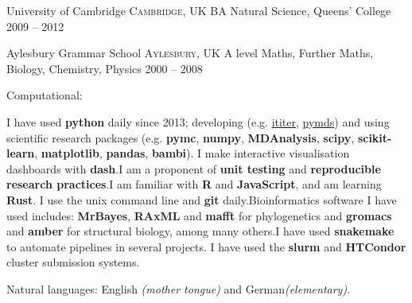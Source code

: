 \documentclass[10pt,a4paper]{article}
\begin{document}
\headedsection
{University of Cambridge}
{\textsc{Cambridge, UK}} {%
  \headedsubsection
  {BA Natural Science, Queens' College}
  {2009 -- 2012}
  {
  }
}

\headedsection
{Aylesbury Grammar School}
{\textsc{Aylesbury, UK}} {
  \headedsubsection
  {A level Maths, Further Maths, Biology, Chemistry, Physics}
  {2000 -- 2008}
  {}
}

\spacedhrule{0.9em}{-0.4em}


\inlineheadsection  %
{Computational:} {
  
  I have used \textbf{python} daily since 2013; developing (e.g.\@
  \href{https://ititer.readthedocs.io/}{ititer},
  \href{https://pymds.readthedocs.io}{pymds}) and using scientific research packages
  (e.g. \textbf{pymc}, \textbf{numpy}, \textbf{MDAnalysis}, \textbf{scipy},
  \textbf{scikit-learn}, \textbf{matplotlib}, \textbf{pandas}, \textbf{bambi}). I make
  interactive visualisation dashboards with \textbf{dash}.\sbull I am a proponent of
  \textbf{unit testing} and \textbf{reproducible research practices}.\sbull I am familiar
  with \textbf{R} and \textbf{JavaScript}, and am learning \textbf{Rust}. \sbull I use
  the unix command line and \textbf{git} daily.\sbull Bioinformatics software I have used
  includes: \textbf{MrBayes}, \textbf{RAxML} and \textbf{mafft} for phylogenetics and
  \textbf{gromacs} and \textbf{amber} for structural biology, among many others.\sbull I
  have used \textbf{snakemake} to automate pipelines in several projects.\sbull
  I have used the \textbf{slurm} and \textbf{HTCondor} cluster submission systems.}

\vspace{0.5em}
\inlineheadsection
{Natural languages:}
{English \emph{(mother tongue)} and German\emph{(elementary)}.}


\spacedhrule{1.6em}{-0.4em}


\inlineheadsection
{}
{
  \renewcommand{\bibsection}{
}
  \nocite{*}
  
}

\spacedhrule{1.6em}{-0.4em}


\end{document}
